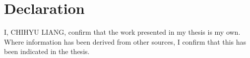 \section*{Declaration}

I, CHIHYU LIANG, confirm that the work presented in my thesis is my own. Where
information has been derived from other sources, I confirm that this has been
indicated in the thesis.
